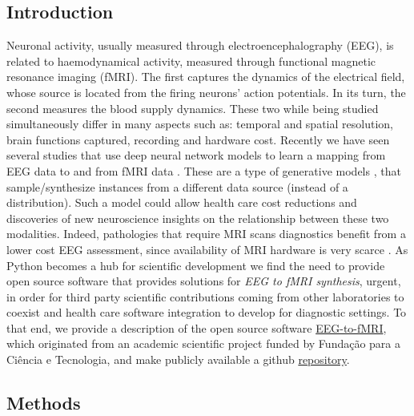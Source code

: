 \subsection{Introduction}\label{section:introduction}


Neuronal activity, usually measured through electroencephalography (EEG), is related to haemodynamical activity, measured through functional magnetic resonance imaging (fMRI). The first captures the dynamics of the electrical field, whose source is located from the firing neurons' action potentials. In its turn, the second measures the blood supply dynamics. These two while being studied simultaneously \cite{shibasaki2008human,yu2016building,he2018spatialtemporaldo,rojas2018study,brechet2019capturing,daly2019electroencephalography,cury2020sparse,abreu2021eeg} differ in many aspects such as: temporal and spatial resolution, brain functions captured, recording and hardware cost. Recently we have seen several studies that use deep neural network models \cite{goodfellow2016deep} to learn a mapping from EEG data to and from fMRI data \cite{liu2019convolutional, calhas2022eeg}. These are a type of generative models \cite{murphy2012machine}, that sample/synthesize instances from a different data source (instead of a distribution). Such a model could allow health care cost reductions and discoveries of new neuroscience insights on the relationship between these two modalities. Indeed, pathologies that require MRI scans diagnostics benefit from a lower cost EEG assessment, since availability of MRI hardware is very scarce \cite{ogbole2018survey}. As Python \cite{van1995python} becomes a hub for scientific development \cite{harris2020array,virtanen2020scipy,abadi2016tensorflow} we find the need to provide open source software that provides solutions for \textit{EEG to fMRI synthesis}, urgent, in order for third party scientific contributions coming from other laboratories to coexist and health care software integration to develop for diagnostic settings. To that end, we provide a description of the open source software \href{https://pypi.org/project/eeg-to-fmri/}{EEG-to-fMRI}, which originated from an academic scientific project funded by Funda\c{c}\~ao para a Ci\^encia e Tecnologia, and make publicly available a github \href{https://github.com/eeg-to-fmri/eeg-to-fmri}{repository}.

\subsection{Methods}\label{section:methods}


